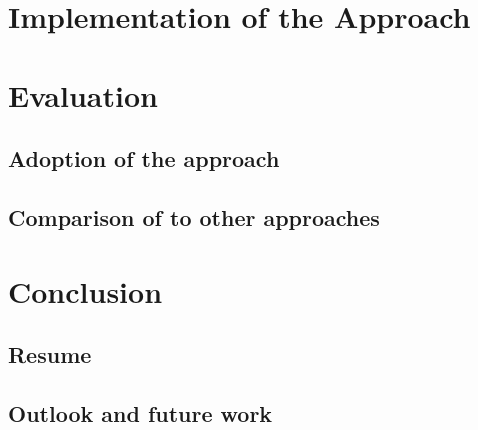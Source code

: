 \chapter{Implementation of the Approach}

\chapter{Evaluation}
\section{Adoption of the approach}
\section{Comparison of to other approaches}

\chapter{Conclusion}
\section{Resume}
\section{Outlook and future work}





